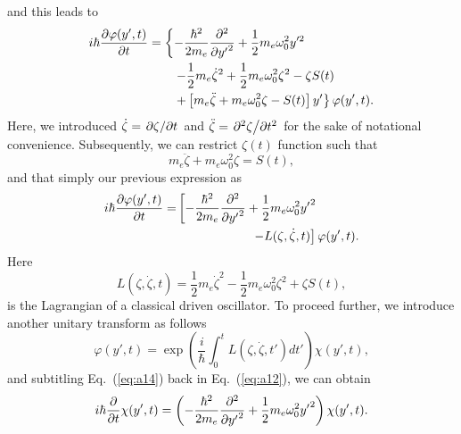 \documentclass[
 reprint,
 amsmath,amssymb,
 aps,
 prb,
]{revtex4-2}
\begin{document}
\begin{appendix}
and this leads to
\begin{equation} \label{eq:a10}
  \begin{aligned}
    i \hbar \pdv{\varphi(y',t)}{t}   &=
    \left\{
        -  \frac{\hbar^2}{2m_e}\pdv[2]{{y'}}
        + \frac{1}{2} m_e \omega_0^2 y'^2
        \right. \\
        & \left. \qquad
        - \frac{1}{2} m_e\dot{\zeta}^2 + \frac{1}{2}m_e\omega_0^2 \zeta^2 - \zeta S(t)
        \right. \\
        & \left. \qquad +
        \left[
            m_e\ddot{\zeta} + m_e\omega_0^2\zeta - S(t)
        \right]y'
    \right\} \varphi(y',t).
  \end{aligned}
\end{equation}
Here, we introduced $\dot{\zeta} = \pdv*{\zeta}{t}$ and $\ddot{\zeta} = \pdv*[2]{\zeta}{t}$ for the sake of notational convenience. Subsequently, we can restrict $\zeta(t)$ function such that
\begin{equation} \label{eq:a11}
  m_e\ddot{\zeta} + m_e\omega_0^2\zeta = S(t),
\end{equation}
and that simply our previous expression as
\begin{equation} \label{eq:a12}
  \begin{aligned}
    i \hbar \pdv{\varphi(y',t)}{t} =&
    \left[
        -  \frac{\hbar^2}{2m_e}\pdv[2]{{y'}}
        + \frac{1}{2} m_e \omega_0^2 {y'}^2 \right. \\
        & \left. \qquad\qquad\qquad
        - L(\zeta,\dot{\zeta},t)
    \right]\varphi(y',t).
  \end{aligned}
\end{equation}
Here
\begin{equation} \label{eq:a13}
  L(\zeta,\dot{\zeta},t) = \frac{1}{2} m_e\dot{\zeta}^2 - \frac{1}{2}m_e\omega_0^2 \zeta^2 + \zeta S(t),
\end{equation}
is the Lagrangian of a classical driven oscillator. To proceed further, we introduce another unitary transform as follows
\begin{equation} \label{eq:a14}
    \varphi(y',t) = \exp(\frac{i}{\hbar}\int_0^{t} L(\zeta,\dot{\zeta},t')dt') \chi(y',t),
\end{equation}
and subtitling Eq.~(\ref{eq:a14}) back in Eq.~(\ref{eq:a12}), we can obtain
\begin{equation} \label{eq:a15}
    i \hbar \pdv{t} \chi(y',t)  =
    \left(
        -  \frac{\hbar^2}{2m_e}\pdv[2]{{y'}}
        + \frac{1}{2} m_e \omega_0^2 {y'}^2
    \right) \chi(y',t).
\end{equation}

\end{appendix}
\end{document}
